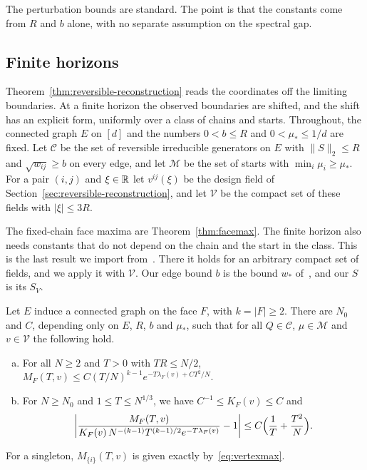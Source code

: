 The perturbation bounds are standard. The point is that the constants come from $R$ and $b$
alone, with no separate assumption on the spectral gap.

\subsection{Finite horizons}\label{sec:finite-horizon}

Theorem~\ref{thm:reversible-reconstruction} reads the coordinates off the limiting boundaries.
At a finite horizon the observed boundaries are shifted, and the shift has an explicit form,
uniformly over a class of chains and starts. Throughout, the connected graph $E$ on $[d]$ and
the numbers $0<b\le R$ and $0<\mu_*\le1/d$ are fixed. Let $\mathcal C$ be the set of reversible
irreducible generators on $E$ with $\|S\|_2\le R$ and $\sqrt{w_{ij}}\ge b$ on every edge, and let
$\mathcal M$ be the set of starts with $\min_i\mu_i\ge\mu_*$. For a pair $(i,j)$ and $\xi\in\mathbb{R}$
let $v^{ij}(\xi)$ be the design field of Section~\ref{sec:reversible-reconstruction}, and let
$\mathcal V$ be the compact set of these fields with $|\xi|\le3R$.

The fixed-chain face maxima are Theorem~\ref{thm:facemax}. The finite horizon also needs
constants that do not depend on the chain and the start in the class. This is the last result
we import from~\cite{paperC1}. There it holds for an arbitrary compact set of fields, and we apply
it with $\mathcal V$. Our edge bound $b$ is the bound $w_*$ of~\cite{paperC1}, and our $S$ is its
$S_V$.

\begin{proposition}\label{prop:uniform-facemax}
Let $E$ induce a connected graph on the face $F$, with $k=|F|\ge2$. There are $N_0$ and $C$,
depending only on $E$, $R$, $b$ and $\mu_*$, such that for all $Q\in\mathcal C$, $\mu\in\mathcal M$
and $v\in\mathcal V$ the following hold.
\begin{enumerate}[(a)]
\item For all $N\ge2$ and $T>0$ with $TR\le N/2$,
$M_F(T,v)\le C(T/N)^{k-1}e^{-T\lambda_F(v)+CT^2/N}$.
\item For $N\ge N_0$ and $1\le T\le N^{1/3}$, we have $C^{-1}\le K_F(v)\le C$ and
\[
 \biggl|\frac{M_F(T,v)}{K_F(v)\,N^{-(k-1)}T^{(k-1)/2}e^{-T\lambda_F(v)}}-1\biggr|
 \le C\Bigl(\frac1T+\frac{T^2}N\Bigr).
\]
\end{enumerate}
For a singleton, $M_{\{i\}}(T,v)$ is given exactly by~\eqref{eq:vertexmax}.
\end{proposition}

